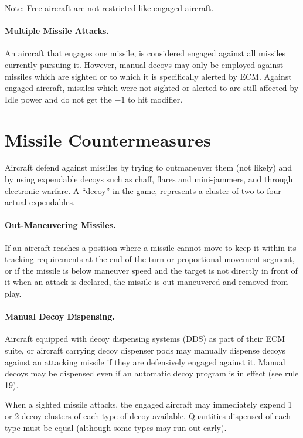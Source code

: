 Note: Free aircraft are not restricted like engaged aircraft.

\paragraph{Multiple Missile Attacks.} An aircraft that engages one missile, is considered engaged against all missiles currently pursuing it. However, manual decoys may only be employed against missiles which are sighted or to which it is specifically alerted by ECM. Against engaged aircraft, missiles which were not sighted or alerted to are still affected by Idle power and do not get the $-1$ to hit modifier.

\section{Missile Countermeasures}

Aircraft defend against missiles by trying to outmaneuver them (not likely) and by using expendable decoys such as chaff, flares and mini-jammers, and through electronic warfare. A “decoy” in the game, represents a cluster of two to four actual expendables.

\paragraph{Out-Maneuvering Missiles.} If an aircraft reaches a position where a missile cannot move to keep it within its tracking requirements at the end of the turn or proportional movement segment, or if the missile is below maneuver speed and the target is not directly in front of it when an attack is declared, the missile is out-maneuvered and removed from play.

\paragraph{Manual Decoy Dispensing.} Aircraft equipped with decoy dispensing systems (DDS) as part of their ECM suite, or aircraft carrying decoy dispenser pods may manually dispense decoys against an attacking missile if they are defensively engaged against it. Manual decoys may be dispensed even if an automatic decoy program is in effect (see rule 19).

When a sighted missile attacks, the engaged aircraft may immediately expend 1 or 2 decoy clusters of each type of decoy available. Quantities dispensed of each type must be equal (although some types may run out early).

